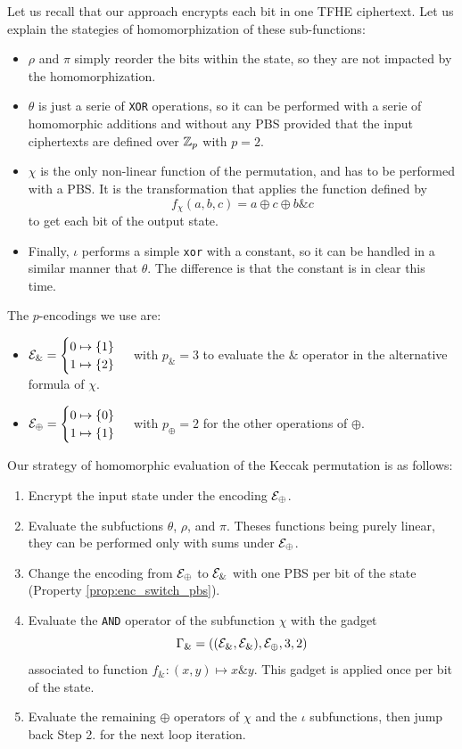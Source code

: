 Let us recall that our approach encrypts each bit in one \gls{TFHE} ciphertext. Let us explain the stategies of homomorphization of these sub-functions:
\begin{itemize}
    \item $\rho$ and $\pi$ simply reorder the bits within the state, so they are not impacted by the homomorphization.
    \item $\theta$ is just a serie of \texttt{XOR} operations, so it can be performed with a serie of homomorphic additions and without any \gls{PBS} provided that the input ciphertexts are defined over $\mathbb{Z}_p$ with $p=2$.
    \item $\chi$ is the only non-linear function of the permutation, and has to be performed with a \gls{PBS}. It is the transformation that applies the function defined by $$f_\chi(a, b, c) = a \oplus c \oplus b \& c$$ to get each bit of the output state.
    \item Finally, $\iota$ performs a simple \texttt{xor} with a constant, so it can be handled in a similar manner that $\theta$. The difference is that the constant is in clear this time.
\end{itemize}
The $p$-encodings we use are:
\begin{itemize}
    \item $\mathcal{E}_{\&} = \begin{cases} 0 \mapsto \{1\} \\ 1 \mapsto \{2\} \end{cases}$ with $p_\& = 3$  to evaluate the $\&$ operator in the alternative formula of $\chi$.
    \item $\mathcal{E}_\oplus = \begin{cases} 0 \mapsto \{0\} \\ 1 \mapsto \{1\} \end{cases}$ with $p_\oplus = 2$ for the other operations of $\oplus$.
\end{itemize}
Our strategy of homomorphic evaluation of the Keccak permutation is as follows:
\begin{enumerate}
    \item Encrypt the input state under the encoding $\mathcal{E}_\oplus$.
    \item Evaluate the subfuctions $\theta$, $\rho$, and $\pi$. Theses functions being purely linear, they can be performed only with sums under $\mathcal{E}_\oplus$.
    \item Change the encoding from $\mathcal{E}_\oplus$ to $\mathcal{E}_\&$ with one \gls{PBS} per bit of the state (Property \ref{prop:enc_switch_pbs}).
    \item Evaluate the \texttt{AND} operator of the subfunction $\chi$ with the gadget \[\Gamma_\& = \left ( (\mathcal{E}_\&, \mathcal{E}_\&), \mathcal{E}_\oplus, 3, 2\right )\] associated to function $f_\& : (x, y) \mapsto x \& y$. This gadget is applied once per bit of the state.
    \item Evaluate the remaining $\oplus$ operators of $\chi$ and the $\iota$ subfunctions, then jump back Step 2. for the next loop iteration.
\end{enumerate}


